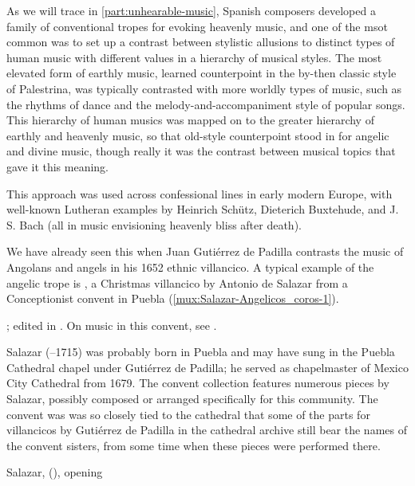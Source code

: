 As we will trace in \cref{part:unhearable-music}, Spanish composers developed a
family of conventional tropes for evoking heavenly music, and one of the msot
common was to set up a contrast between stylistic allusions to distinct types
of human music with different values in a hierarchy of musical styles.
The most elevated form of earthly music, learned counterpoint in the by-then
classic style of Palestrina, was typically contrasted with more worldly types
of music, such as the rhythms of dance and the melody-and-accompaniment style
of popular songs.
This hierarchy of human musics was mapped on to the greater hierarchy of
earthly and heavenly music, so that old-style counterpoint stood in for
angelic and divine music, though really it was the contrast between musical
topics that gave it this meaning.%
\begin{Footnote}
    This approach was used across confessional lines in early modern Europe,
    with well-known Lutheran examples by Heinrich Schütz, Dieterich Buxtehude,
    and J. S. Bach (all in music envisioning heavenly bliss after death).%
    \Autocites
    {Johnston:Rhetorical}
    {Yearsley:Buxtehude}
    {Yearsley:BachCounterpoint}
\end{Footnote}
We have already seen this when Juan Gutiérrez de Padilla contrasts the music of
Angolans and angels in his 1652 ethnic villancico.
A typical example of the angelic trope is , a Christmas villancico by Antonio de Salazar from a Conceptionist
convent in Puebla (\cref{mux:Salazar-Angelicos_coros-1}).%
\begin{Footnote} 
    ; edited in \autocite{Cashner:WLSCM32}.  
    On music in this convent, see \autocite{Favila:Profession}.
\end{Footnote}
Salazar (--1715) was probably born in Puebla and may have sung in
the Puebla Cathedral chapel under Gutiérrez de Padilla; he served as
chapelmaster of Mexico City Cathedral from 1679.%
    \Autocite{Koegel:Salazar} 
The convent collection features numerous pieces by Salazar, possibly composed
or arranged specifically for this community.
The convent was was so closely tied to the cathedral that some of the parts for
villancicos by Gutiérrez de Padilla in the cathedral archive still bear the
names of the convent sisters, from some time when these pieces were performed
there.%
    \Autocite{Tello:SanchezGarzaCatalogo}

{Salazar,  (),
opening}

